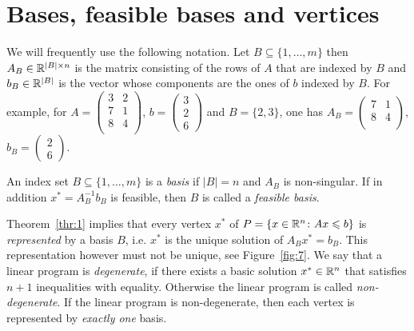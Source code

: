\section{Bases, feasible bases and vertices}
\label{sec:non-degenerate-case}

We will frequently use the following notation. Let $B \subseteq \{1,\dots,m\}$ then $A_B \in \mathbb{R}^{|B| \times n}$ is the matrix consisting of the rows of $A$ that are indexed by   $B$ and $b_B \in \mathbb{R}^{|B|}$  is the vector whose components are the ones of $b$ indexed by $B$. For example, for 
$    A = 
    \begin{pmatrix}
      3 & 2  \\
      7 & 1\\
      8 & 4\\
    \end{pmatrix}$,  $b = 
    \begin{pmatrix}
      3 \\ 2\\ 6
    \end{pmatrix}$ 
and  $B = \{2,3\}$, one has $A_B =  \begin{pmatrix}
          7 & 1\\
      8 & 4\\
    \end{pmatrix}$,  $b_B = 
    \begin{pmatrix}
      2\\ 6
    \end{pmatrix}$. 

    \begin{definition}
      \label{def:s1-1}
      An index set $B \subseteq \{1,\dots,m\}$ is a \emph{basis} if
      $|B| = n$ and $A_B$ is non-singular. If in addition $x^* =
      A_B^{-1} b_B$ is feasible, then $B$ is called a \emph{feasible
        basis}.
    \end{definition}

    Theorem~\ref{thr:1} implies that every vertex $x^*$ of $P = \{x
    \in \mathbb{R}^n \colon Ax \leqslant b\}$ is \emph{represented} by a basis $B$,
    i.e. $x^*$ is the unique solution of $A_Bx^* = b_B$. This
    representation however must not be unique, see
    Figure~\ref{fig:7}. We say that a linear program is \emph{degenerate}, if
    there exists a basic solution $x^* \in \mathbb{R}^n$ that satisfies $n+1$
    inequalities with equality. Otherwise the linear program is called
    \emph{non-degenerate}. If the linear program is non-degenerate,
    then each vertex is represented by \emph{exactly one} basis.

